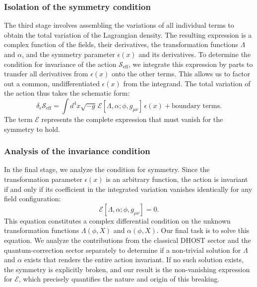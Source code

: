 \documentclass[twocolumn]{aastex631}
\begin{document}
\subsubsection{Isolation of the symmetry condition}
The third stage involves assembling the variations of all individual terms to obtain the total variation of the Lagrangian density. The resulting expression is a complex function of the fields, their derivatives, the transformation functions $\Lambda$ and $\alpha$, and the symmetry parameter $\epsilon(x)$ and its derivatives. To determine the condition for invariance of the action $\mathcal{S}_{\text{eff}}$, we integrate this expression by parts to transfer all derivatives from $\epsilon(x)$ onto the other terms. This allows us to factor out a common, undifferentiated $\epsilon(x)$ from the integrand. The total variation of the action thus takes the schematic form:
\begin{equation}
    \delta_\epsilon \mathcal{S}_{\text{eff}} = \int d^4x \sqrt{-g} \, \mathcal{E}[\Lambda, \alpha; \phi, g_{\mu\nu}] \, \epsilon(x) + \text{boundary terms}.
\end{equation}
The term $\mathcal{E}$ represents the complete expression that must vanish for the symmetry to hold.

\subsubsection{Analysis of the invariance condition}
In the final stage, we analyze the condition for symmetry. Since the transformation parameter $\epsilon(x)$ is an arbitrary function, the action is invariant if and only if its coefficient in the integrated variation vanishes identically for any field configuration:
\begin{equation}
    \mathcal{E}[\Lambda, \alpha; \phi, g_{\mu\nu}] = 0.
\end{equation}
This equation constitutes a complex differential condition on the unknown transformation functions $\Lambda(\phi, X)$ and $\alpha(\phi, X)$. Our final task is to solve this equation. We analyze the contributions from the classical DHOST sector and the quantum-correction sector separately to determine if a non-trivial solution for $\Lambda$ and $\alpha$ exists that renders the entire action invariant. If no such solution exists, the symmetry is explicitly broken, and our result is the non-vanishing expression for $\mathcal{E}$, which precisely quantifies the nature and origin of this breaking.
\end{document}

